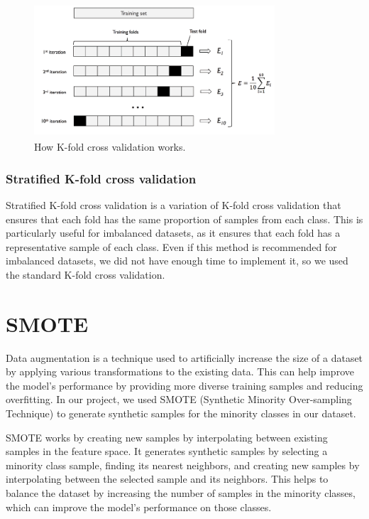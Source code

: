 \begin{figure}[htbp]
	\centering
	\includegraphics[width=0.8\textwidth]{../imgs/kfold.png}
	\caption{How K-fold cross validation works.\textsuperscript{\cite{Raschka-Mirjalili-2017}}}
	\label{fig:k_fold}
\end{figure}

\subsubsection{Stratified K-fold cross validation}
\label{subsec:stratified_k_fold_cross_validation}

Stratified K-fold cross validation is a variation of K-fold cross validation that ensures that each fold has the same proportion of samples
from each class. This is particularly useful for imbalanced datasets, as it ensures that each fold has a representative sample of each class.
Even if this method is recommended for imbalanced datasets, we did not have enough time to implement it, so we used the standard K-fold cross
validation.

\section{SMOTE}
\label{sec:smote}

Data augmentation is a technique used to artificially increase the size of a dataset by applying various transformations to the existing data.
This can help improve the model's performance by providing more diverse training samples and reducing overfitting. In our project, we used SMOTE
(Synthetic Minority Over-sampling Technique) to generate synthetic samples for the minority classes in our dataset.

SMOTE works by creating new samples by interpolating between existing samples in the feature space. It generates synthetic samples by selecting
a minority class sample, finding its nearest neighbors, and creating new samples by interpolating between the selected sample and its neighbors.
This helps to balance the dataset by increasing the number of samples in the minority classes, which can improve the model's performance on those
classes.

